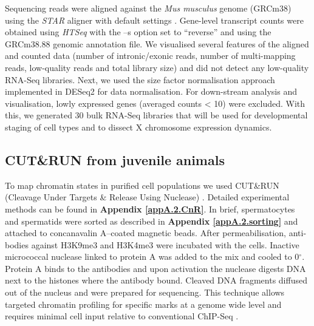 Sequencing reads were aligned against the \textit{Mus musculus} genome (GRCm38) using the \emph{STAR} aligner with default settings \citep{Dobin2013}. Gene-level transcript counts were obtained using \emph{HTSeq} \citep{Anders2014} with the –s option set to “reverse” and using the GRCm38.88 genomic annotation file. We visualised several features of the aligned and counted data (number of intronic/exonic reads, number of multi-mapping reads, low-quality reads and total library size) and did not detect any low-quality RNA-Seq libraries. Next, we used the size factor normalisation approach implemented in DESeq2 \citep{Love2014} for data normalisation. For down-stream analysis and visualisation, lowly expressed genes (averaged counts < 10) were excluded. With this, we generated 30 bulk RNA-Seq libraries that will be used for developmental staging of cell types and to dissect X chromosome expression dynamics.

\subsection{CUT\&{}RUN from juvenile animals}

To map chromatin states in purified cell populations we used CUT\&{}RUN (Cleavage Under Targets \& Release Using Nuclease) \citep{Skene2018}. Detailed experimental methods can be found in \textbf{Appendix \ref{appA.2.CnR}}. In brief, spermatocytes and spermatids were sorted as described in \textbf{Appendix \ref{appA.2.sorting}} and attached to concanavalin A–coated magnetic beads. After permeabilisation, anti-bodies against H3K9me3 and H3K4me3 were incubated with the cells. Inactive micrococcal nuclease linked to protein A was added to the mix and cooled to 0$^\circ$. Protein A binds to the antibodies and upon activation the nuclease digests DNA next to the histones where the antibody bound. Cleaved DNA fragments diffused out of the nucleus and were prepared for sequencing. This technique allows targeted chromatin profiling for specific marks at a genome wide level and requires minimal cell input relative to conventional ChIP-Seq \citep{Skene2018}.\\


